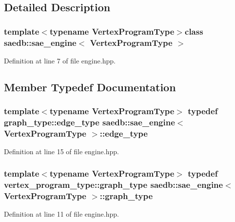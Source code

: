\subsection{Detailed Description}
\subsubsection*{template$<$typename Vertex\-Program\-Type$>$class saedb\-::sae\-\_\-engine$<$ Vertex\-Program\-Type $>$}



Definition at line 7 of file engine.\-hpp.



\subsection{Member Typedef Documentation}
\hypertarget{classsaedb_1_1sae__engine_a0e500fe959827d10ef1164ae6ee3563f}{
\subsubsection[{edge\-\_\-type}]{\setlength{\rightskip}{0pt plus 5cm}template$<$typename Vertex\-Program\-Type$>$ typedef {\bf graph\-\_\-type\-::edge\-\_\-type} {\bf saedb\-::sae\-\_\-engine}$<$ Vertex\-Program\-Type $>$\-::{\bf edge\-\_\-type}}}\label{d9/d3c/classsaedb_1_1sae__engine_a0e500fe959827d10ef1164ae6ee3563f}


Definition at line 15 of file engine.\-hpp.

\hypertarget{classsaedb_1_1sae__engine_a23370233de451071df13960fe21fc02a}{
\subsubsection[{graph\-\_\-type}]{\setlength{\rightskip}{0pt plus 5cm}template$<$typename Vertex\-Program\-Type$>$ typedef vertex\-\_\-program\-\_\-type\-::graph\-\_\-type {\bf saedb\-::sae\-\_\-engine}$<$ Vertex\-Program\-Type $>$\-::{\bf graph\-\_\-type}}}\label{d9/d3c/classsaedb_1_1sae__engine_a23370233de451071df13960fe21fc02a}


Definition at line 11 of file engine.\-hpp.

